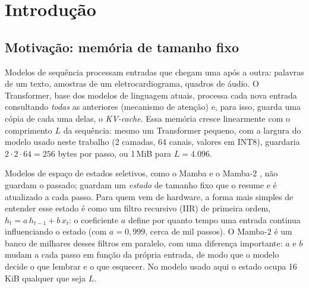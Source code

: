 \documentclass[12pt]{article}
\begin{document}
\section{Introdução}

\subsection{Motivação: memória de tamanho fixo}
Modelos de sequência processam entradas que chegam uma após a outra: palavras de um texto, amostras de um eletrocardiograma, quadros de áudio. O Transformer, base dos modelos de linguagem atuais, processa cada nova entrada consultando \emph{todas} as anteriores (mecanismo de atenção) e, para isso, guarda uma cópia de cada uma delas, o \emph{KV-cache}. Essa memória cresce linearmente com o comprimento $L$ da sequência: mesmo um Transformer pequeno, com a largura do modelo usado neste trabalho (2 camadas, 64 canais, valores em INT8), guardaria $2 \cdot 2 \cdot 64 = 256$ bytes por passo, ou 1\,MiB para $L = 4.096$.

Modelos de espaço de estados seletivos, como o Mamba \cite{gu2024mamba} e o Mamba-2 \cite{dao2024transformers}, não guardam o passado; guardam um \emph{estado} de tamanho fixo que o resume e é atualizado a cada passo. Para quem vem de hardware, a forma mais simples de entender esse estado é como um filtro recursivo (IIR) de primeira ordem, $h_t = a\,h_{t-1} + b\,x_t$: o coeficiente $a$ define por quanto tempo uma entrada continua influenciando o estado (com $a = 0{,}999$, cerca de mil passos). O Mamba-2 é um banco de milhares desses filtros em paralelo, com uma diferença importante: $a$ e $b$ mudam a cada passo em função da própria entrada, de modo que o modelo decide o que lembrar e o que esquecer. No modelo usado aqui o estado ocupa 16\,KiB qualquer que seja $L$.
\end{document}

